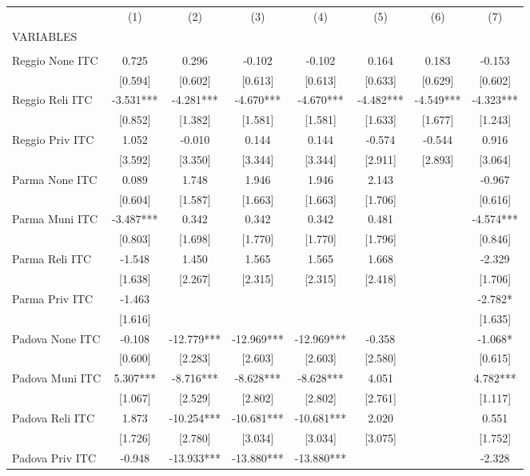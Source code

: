 \begin{tabular}{lccccccc} \hline
 & (1) & (2) & (3) & (4) & (5) & (6) & (7) \\
VARIABLES &  &  &  &  &  &  &  \\ \hline
 &  &  &  &  &  &  &  \\
Reggio None ITC & 0.725 & 0.296 & -0.102 & -0.102 & 0.164 & 0.183 & -0.153 \\
 & [0.594] & [0.602] & [0.613] & [0.613] & [0.633] & [0.629] & [0.602] \\
Reggio Reli ITC & -3.531*** & -4.281*** & -4.670*** & -4.670*** & -4.482*** & -4.549*** & -4.323*** \\
 & [0.852] & [1.382] & [1.581] & [1.581] & [1.633] & [1.677] & [1.243] \\
Reggio Priv ITC & 1.052 & -0.010 & 0.144 & 0.144 & -0.574 & -0.544 & 0.916 \\
 & [3.592] & [3.350] & [3.344] & [3.344] & [2.911] & [2.893] & [3.064] \\
Parma None ITC & 0.089 & 1.748 & 1.946 & 1.946 & 2.143 &  & -0.967 \\
 & [0.604] & [1.587] & [1.663] & [1.663] & [1.706] &  & [0.616] \\
Parma Muni ITC & -3.487*** & 0.342 & 0.342 & 0.342 & 0.481 &  & -4.574*** \\
 & [0.803] & [1.698] & [1.770] & [1.770] & [1.796] &  & [0.846] \\
Parma Reli ITC & -1.548 & 1.450 & 1.565 & 1.565 & 1.668 &  & -2.329 \\
 & [1.638] & [2.267] & [2.315] & [2.315] & [2.418] &  & [1.706] \\
Parma Priv ITC & -1.463 &  &  &  &  &  & -2.782* \\
 & [1.616] &  &  &  &  &  & [1.635] \\
Padova None ITC & -0.108 & -12.779*** & -12.969*** & -12.969*** & -0.358 &  & -1.068* \\
 & [0.600] & [2.283] & [2.603] & [2.603] & [2.580] &  & [0.615] \\
Padova Muni ITC & 5.307*** & -8.716*** & -8.628*** & -8.628*** & 4.051 &  & 4.782*** \\
 & [1.067] & [2.529] & [2.802] & [2.802] & [2.761] &  & [1.117] \\
Padova Reli ITC & 1.873 & -10.254*** & -10.681*** & -10.681*** & 2.020 &  & 0.551 \\
 & [1.726] & [2.780] & [3.034] & [3.034] & [3.075] &  & [1.752] \\
Padova Priv ITC & -0.948 & -13.933*** & -13.880*** & -13.880*** &  &  & -2.328 \\

\end{tabular}
